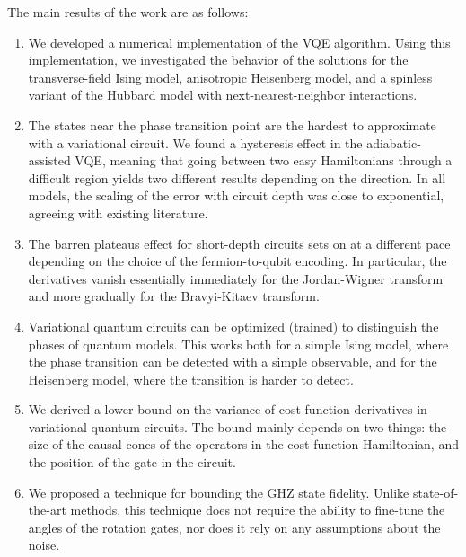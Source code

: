 The main results of the work are as follows:
\begin{enumerate}
    \item We developed a numerical implementation of the VQE algorithm. Using this implementation, we investigated the behavior of the solutions for the transverse-field Ising model, anisotropic Heisenberg model, and a spinless variant of the Hubbard model with next-nearest-neighbor interactions. 
    \item The states near the phase transition point are the hardest to approximate with a variational circuit. We found a hysteresis effect in the adiabatic-assisted VQE, meaning that going between two easy Hamiltonians through a difficult region yields two different results depending on the direction. In all models, the scaling of the error with circuit depth was close to exponential, agreeing with existing literature.
    \item The barren plateaus effect for short-depth circuits sets on at a different pace depending on the choice of the fermion-to-qubit encoding. In particular, the derivatives vanish essentially immediately for the Jordan-Wigner transform and more gradually for the Bravyi-Kitaev transform.
    \item Variational quantum circuits can be optimized (trained) to distinguish the phases of quantum models. This works both for a simple Ising model, where the phase transition can be detected with a simple observable, and for the Heisenberg model, where the transition is harder to detect.
    \item We derived a lower bound on the variance of cost function derivatives in variational quantum circuits. The bound mainly depends on two things: the size of the causal cones of the operators in the cost function Hamiltonian, and the position of the gate in the circuit.
    \item We proposed a technique for bounding the GHZ state fidelity. Unlike state-of-the-art methods, this technique does not require the ability to fine-tune the angles of the rotation gates, nor does it rely on any assumptions about the noise.
\end{enumerate}




